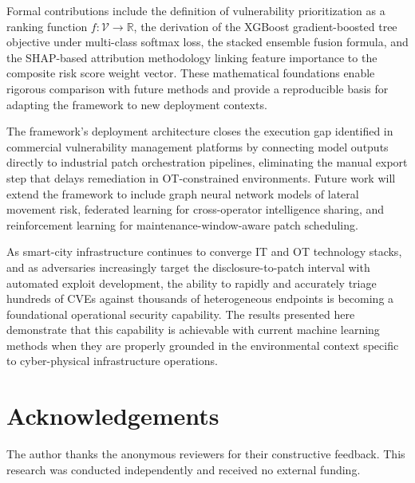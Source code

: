 \documentclass[review,12pt]{elsarticle}
\begin{document}
Formal contributions include the definition of vulnerability prioritization as a ranking function $f: \mathcal{V} \rightarrow \mathbb{R}$, the derivation of the XGBoost gradient-boosted tree objective under multi-class softmax loss, the stacked ensemble fusion formula, and the SHAP-based attribution methodology linking feature importance to the composite risk score weight vector. These mathematical foundations enable rigorous comparison with future methods and provide a reproducible basis for adapting the framework to new deployment contexts.

The framework's deployment architecture closes the execution gap identified in commercial vulnerability management platforms by connecting model outputs directly to industrial patch orchestration pipelines, eliminating the manual export step that delays remediation in OT-constrained environments. Future work will extend the framework to include graph neural network models of lateral movement risk, federated learning for cross-operator intelligence sharing, and reinforcement learning for maintenance-window-aware patch scheduling.

As smart-city infrastructure continues to converge IT and OT technology stacks, and as adversaries increasingly target the disclosure-to-patch interval with automated exploit development, the ability to rapidly and accurately triage hundreds of CVEs against thousands of heterogeneous endpoints is becoming a foundational operational security capability. The results presented here demonstrate that this capability is achievable with current machine learning methods when they are properly grounded in the environmental context specific to cyber-physical infrastructure operations.

\section*{Acknowledgements}
The author thanks the anonymous reviewers for their constructive feedback. This research was conducted independently and received no external funding.


\end{document}

